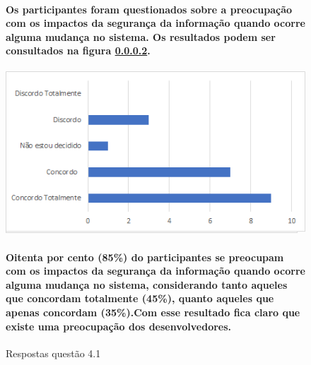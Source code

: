 \begin{figure}[!t]
\centering

\paragraph{Os participantes foram questionados sobre a preocupação com os impactos da segurança da informação quando ocorre alguma mudança no sistema. Os resultados podem ser consultados na figura \ref{fig:4.1}.}
\includegraphics[scale=0.7]{figuras das questoes/4.1.png}
\caption{Respostas questão 4.1}
\paragraph{Oitenta por cento (85{\%}) do participantes se preocupam com os impactos da segurança da informação quando ocorre alguma mudança no sistema, considerando tanto aqueles que concordam totalmente (45{\%}), quanto aqueles que apenas concordam (35{\%}).Com esse resultado fica claro que existe uma preocupação dos desenvolvedores.}

\label{fig:4.1}
\end{figure}
